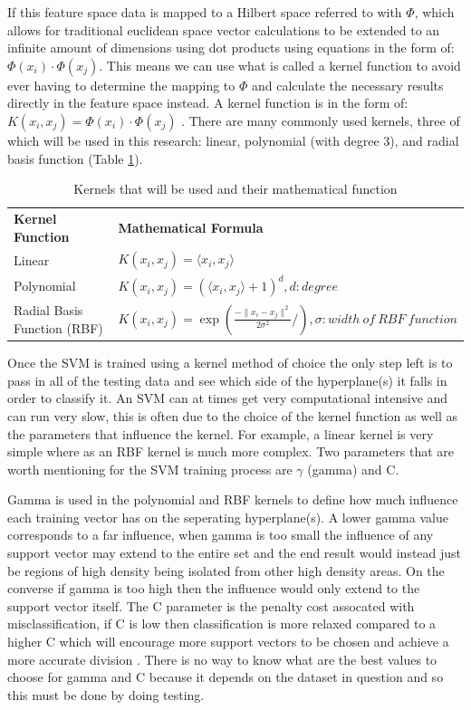 If this feature space data is mapped to a Hilbert space referred to with $\Phi$, which allows for traditional euclidean space vector calculations to be extended to an infinite amount of dimensions using dot products using equations in the form of: $\Phi\left(x_i \right)\cdot\Phi\left(x_j \right)$.  This means we can use what is called a kernel function to avoid ever having to determine the mapping to $\Phi$ and calculate the necessary results directly in the feature space instead.  A kernel function is in the form of: $K(x_{i},x_{j}) = \Phi(x_i) \cdot \Phi(x_j)$ \cite{supervisedMachineLearning}.  There are many commonly used kernels, three of which will be used in this research: linear, polynomial (with degree 3), and radial basis function (Table \ref{tab:kernels}).  

\begin{table}[h]
	\centering
	\begin{tabular}{|p{1.5in}|p{4.5in}|}
	\hline
		\textbf{Kernel Function} & \textbf{Mathematical Formula}\\
	\hhline{|=|=|}
		Linear  & $K(x_{i},x_{j}) = \langle x_{i},x_{j}\rangle$ \\
	\hline
		Polynomial & $K(x_{i},x_{j}) = (\langle x_{i},x_{j}\rangle + 1)^d, d: degree$ \\
	\hline
		Radial Basis Function (RBF) & $K(x_{i},x_{j}) = \exp\left(\frac{- \parallel x_i - x_j \parallel^2}{2\sigma^2} /\right), \sigma : width\ of\ RBF\ function$ \\
	\hline
	\end{tabular}
	\caption{Kernels that will be used and their mathematical function \cite{intrusionDetectionCostBased}} 
	\label{tab:kernels}
\end{table}

Once the SVM is trained using a kernel method of choice the only step left is to pass in all of the testing data and see which side of the hyperplane(s) it falls in order to classify it.  An SVM can at times get very computational intensive and can run very slow, this is often due to the choice of the kernel function as well as the parameters that influence the kernel.  For example, a linear kernel is very simple where as an RBF kernel is much more complex.  Two parameters that are worth mentioning for the SVM training process are $\gamma$ (gamma) and C.

Gamma is used in the polynomial and RBF kernels to define how much influence each training vector has on the seperating hyperplane(s).  A lower gamma value corresponds to a far influence, when gamma is too small the influence of any support vector may extend to the entire set and the end result would instead just be regions of high density being isolated from other high density areas.  On the converse if gamma is too high then the influence would only extend to the support vector itself.  The C parameter is the penalty cost assocated with misclassification, if C is low then classification is more relaxed compared to a higher C which will encourage more support vectors to be chosen and achieve a more accurate division \cite{rbfSVMParameters}.  There is no way to know what are the best values to choose for gamma and C because it depends on the dataset in question and so this must be done by doing testing.

